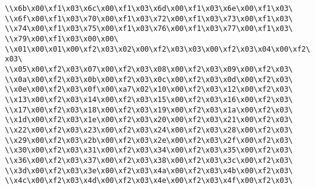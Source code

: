 \verb|\\x6b\x00\xf1\x03\x6c\x00\xf1\x03\x6d\x00\xf1\x03\x6e\x00\xf1\x03\|\newline
\verb|\\x6f\x00\xf1\x03\x70\x00\xf1\x03\x72\x00\xf1\x03\x73\x00\xf1\x03\|\newline
\verb|\\x74\x00\xf1\x03\x75\x00\xf1\x03\x76\x00\xf1\x03\x77\x00\xf1\x03\|\newline
\verb|\\x79\x00\xf1\x03\x00\x00\|\newline
\verb|\\x01\x00\x01\x00\xf2\x03\x02\x00\xf2\x03\x03\x00\xf2\x03\x04\x00\xf2\x03\|\newline
\verb|\\x05\x00\xf2\x03\x07\x00\xf2\x03\x08\x00\xf2\x03\x09\x00\xf2\x03\|\newline
\verb|\\x0a\x00\xf2\x03\x0b\x00\xf2\x03\x0c\x00\xf2\x03\x0d\x00\xf2\x03\|\newline
\verb|\\x0e\x00\xf2\x03\x0f\x00\xa7\x02\x10\x00\xf2\x03\x12\x00\xf2\x03\|\newline
\verb|\\x13\x00\xf2\x03\x14\x00\xf2\x03\x15\x00\xf2\x03\x16\x00\xf2\x03\|\newline
\verb|\\x17\x00\xf2\x03\x18\x00\xf2\x03\x19\x00\xf2\x03\x1a\x00\xf2\x03\|\newline
\verb|\\x1d\x00\xf2\x03\x1e\x00\xf2\x03\x20\x00\xf2\x03\x21\x00\xf2\x03\|\newline
\verb|\\x22\x00\xf2\x03\x23\x00\xf2\x03\x24\x00\xf2\x03\x28\x00\xf2\x03\|\newline
\verb|\\x29\x00\xf2\x03\x2b\x00\xf2\x03\x2e\x00\xf2\x03\x2f\x00\xf2\x03\|\newline
\verb|\\x30\x00\xf2\x03\x31\x00\xf2\x03\x34\x00\xf2\x03\x35\x00\xf2\x03\|\newline
\verb|\\x36\x00\xf2\x03\x37\x00\xf2\x03\x38\x00\xf2\x03\x3c\x00\xf2\x03\|\newline
\verb|\\x3d\x00\xf2\x03\x3e\x00\xf2\x03\x4a\x00\xf2\x03\x4b\x00\xf2\x03\|\newline
\verb|\\x4c\x00\xf2\x03\x4d\x00\xf2\x03\x4e\x00\xf2\x03\x4f\x00\xf2\x03\|\newline
